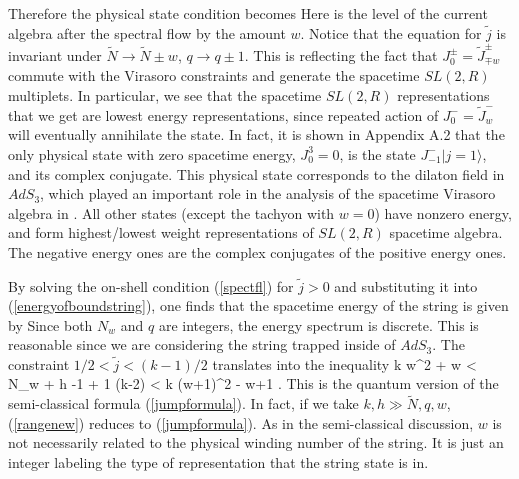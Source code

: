  Therefore the physical state condition becomes
Here
is the level of the current algebra after the spectral flow by
the amount $w$. 
Notice that the equation for $\tilde j$ is invariant under 
$\tilde{N} \to \tilde{N} \pm w $, 
$ q \to q \pm 1 $. This is reflecting the fact that $J^\pm_0 = \tilde
J^\pm_{\mp w} $ commute with the Virasoro constraints and generate
the spacetime $SL(2,R)$ multiplets. 
In particular,  we see that
the spacetime 
 $SL(2,R)$ representations that we get are lowest energy representations,
since repeated action of 
 $J_0^- = \tilde J^-_w$ will eventually  annihilate the state.
In fact, it is shown in Appendix A.2 that 
 the only physical state with zero spacetime energy,
$J^3_0=0$, is the state $J^-_{-1} |j =1\rangle$, and its complex conjugate.
This physical state corresponds to the dilaton field
in $AdS_3$, which played an important role in
the analysis of the spacetime Virasoro algebra
in \cite{Kutasov:1999xu}. 
All other states (except the tachyon with $ w =0$) have nonzero energy,
and form highest/lowest weight representations of $SL(2,R)$ spacetime
algebra. The negative energy ones are the complex conjugates of the
positive energy ones. 


By solving the on-shell condition (\ref{spectfl})
for $\tilde{j} > 0$ and substituting it into
(\ref{energyofboundstring}), one finds that the
spacetime energy of the string is given by
Since both $N_w$ and $q$ are integers,
the energy spectrum is discrete. 
This is reasonable since we are considering the string
trapped inside of $AdS_3$.
The constraint $1/2 < \tilde{j} <(k-1)/2$ translates into
the inequality
{{k } w^2 + {w }
< N_w + h -1  + {1 (k-2)}  <  
{k } (w+1)^2 - {w+1 }.}
This is the quantum version of the semi-classical formula
(\ref{jumpformula}). In fact, if we take $k, h \gg \tilde{N}, q, w$,
(\ref{rangenew}) reduces to (\ref{jumpformula}). 
As in the semi-classical discussion, $w$ is not necessarily related to the
physical winding number of the string. It is just an integer labeling the 
type of representation that the string state is in. 




